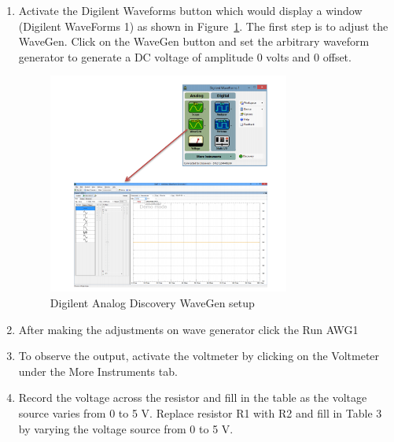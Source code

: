 \documentclass{article}
\begin{document}
\begin{enumerate}
  \item Activate the Digilent Waveforms button which would display a window (Digilent
  WaveForms 1) as shown in Figure~\ref{fig:dadwg}. The first step is to adjust the WaveGen.
  Click on the WaveGen button and set the arbitrary waveform generator to generate a DC
  voltage of amplitude 0 volts and 0 offset.
    \begin{figure}[!ht]
  \centering
  \caption{Digilent Analog Discovery WaveGen setup\label{fig:dadwg}}
  \includegraphics[width=0.75\textwidth]{img/awg.png}
  \end{figure}



  \item After making the adjustments on wave generator click the Run AWG1
  \item To observe the output, activate the voltmeter by clicking on the Voltmeter under the
  More Instruments tab.
  \item Record the voltage across the resistor and fill in the table as the voltage source varies from
  0 to 5 V. Replace resistor R1 with R2 and fill in Table 3 by varying the voltage source from 0 to 5
  V.
\end{enumerate}
\vspace{1cm}
\end{document}
